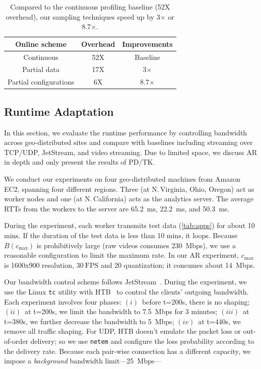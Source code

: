 \begin{table}[t]
  \small
  \centering
  \begin{tabular}{c c c}
    \toprule
    Online scheme & Overhead & Improvements \\
    \midrule
    Continuous & 52X & Baseline \\
    Partial data & 17X & 3$\times$\\
    Partial configurations & 6X & 8.7$\times$ \\
    \bottomrule
  \end{tabular}
  \vspace{0.5em}
  \caption{Compared to the continuous profiling baseline (52X overhead), our
    sampling techniques speed up by 3$\times$ or 8.7$\times$.}
  \label{tab:online}
  \vspace{-1em}
\end{table}

\subsection{Runtime Adaptation}
\label{sec:runtime-adaptation}

In this section, we evaluate the runtime performance by controlling bandwidth
across geo-distributed sites and compare \sysname{} with baselines including
streaming over TCP/UDP, JetStream, and video streaming. Due to limited space, we
discuss AR in depth and only present the results of PD/TK.

 We conduct our experiments on four geo-distributed
machines from Amazon EC2, spanning four different regions. Three (at
N.\,Virginia, Ohio, Oregon) act as worker nodes and one (at N.\,California) acts
as the analytics server. The average RTTs from the workers to the server are
\SI{65.2}{\ms}, \SI{22.2}{\ms}, and \SI{50.3}{ms}.

During the experiment, each worker transmits test data (\autoref{tab:apps}) for
about 10 mins. If the duration of the test data is less than 10 mins, it
loops. Because $B(c_{\max})$ is prohibitively large (raw videos consumes
\SI{230}{Mbps}), we use a reasonable configuration to limit the maximum rate. In
our AR experiment, $c_{\max}$ is 1600x900 resolution, \(30~\text{FPS}\) and 20
quantization; it consumes about \SI{14}{Mbps}.

Our bandwidth control scheme follows JetStream~\cite{rabkin2014aggregation}.
During the experiment, we use the Linux \texttt{tc} utility with HTB~\cite{htb,
  lartc} to control the clients' outgoing bandwidth. Each experiment involves
four phases: $(i)$~before t=200s, there is no shaping; $(ii)$~at t=200s, we
limit the bandwidth to \SI{7.5}{Mbps} for 3 minutes; $(iii)$~at t=380s, we
further decrease the bandwidth to \SI{5}{Mbps}; $(iv)$~at t=440s, we remove all
traffic shaping. For UDP, HTB doesn't emulate the packet loss or out-of-order
delivery; so we use \texttt{netem} and configure the loss probability according
to the delivery rate. Because each pair-wise connection has a different
capacity, we impose a \textit{background} bandwidth
limit---\SI{25}{Mbps}---

